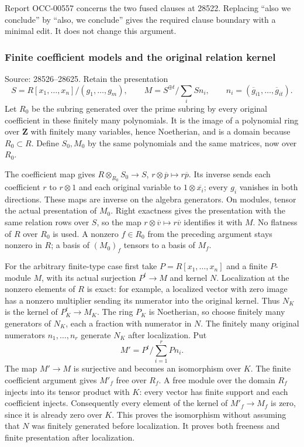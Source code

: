 Report OCC-00557 concerns the two fused clauses at 28522. Replacing ``also we conclude'' by ``also, we conclude'' gives the required clause boundary with a minimal edit. It does not change this argument.

\subsubsection{Finite coefficient models and the original relation kernel}\label{algebra-proof-027-finite-coefficient-models-and-the-original-relation-kernel}

Source: 28526--28625. Retain the presentation \[
 S=R[x_1,\ldots,x_n]/(g_1,\ldots,g_m),\qquad
 M=S^{\oplus t}/\sum_i S n_i,\qquad
 n_i=(\overline g_{i1},\ldots,\overline g_{it}).
\] Let \(R_0\) be the subring generated over the prime subring by every original coefficient in these finitely many polynomials. It is the image of a polynomial ring over \(\mathbf Z\) with finitely many variables, hence Noetherian, and is a domain because \(R_0\subset R\). Define \(S_0,M_0\) by the same polynomials and the same matrices, now over \(R_0\).

The coefficient map gives \(R\otimes_{R_0}S_0\to S\), \(r\otimes \overline p\mapsto r\overline p\). Its inverse sends each coefficient \(r\) to \(r\otimes1\) and each original variable to \(1\otimes\overline{x_i}\); every \(g_i\) vanishes in both directions. These maps are inverse on the algebra generators. On modules, tensor the actual presentation of \(M_0\). Right exactness gives the presentation with the same relation rows over \(S\), so the map \(r\otimes\overline v\mapsto r\overline v\) identifies it with \(M\). No flatness of \(R\) over \(R_0\) is used. A nonzero \(f\in R_0\) from the preceding argument stays nonzero in \(R\); a basis of \((M_0)_f\) tensors to a basis of \(M_f\).

For the arbitrary finite-type case first take \(P=R[x_1,\ldots,x_n]\) and a finite \(P\)-module \(M\), with its actual surjection \(P^t\to M\) and kernel \(N\). Localization at the nonzero elements of \(R\) is exact: for example, a localized vector with zero image has a nonzero multiplier sending its numerator into the original kernel. Thus \(N_K\) is the kernel of \(P_K^t\to M_K\). The ring \(P_K\) is Noetherian, so choose finitely many generators of \(N_K\), each a fraction with numerator in \(N\). The finitely many original numerators \(n_1,\ldots,n_r\) generate \(N_K\) after localization. Put \[
 M'=P^t/\sum_{i=1}^r Pn_i.
\] The map \(M'\to M\) is surjective and becomes an isomorphism over \(K\). The finite coefficient argument gives \(M'_f\) free over \(R_f\). A free module over the domain \(R_f\) injects into its tensor product with \(K\): every vector has finite support and each coefficient injects. Consequently every element of the kernel of \(M'_f\to M_f\) is zero, since it is already zero over \(K\). This proves the isomorphism without assuming that \(N\) was finitely generated before localization. It proves both freeness and finite presentation after localization.

